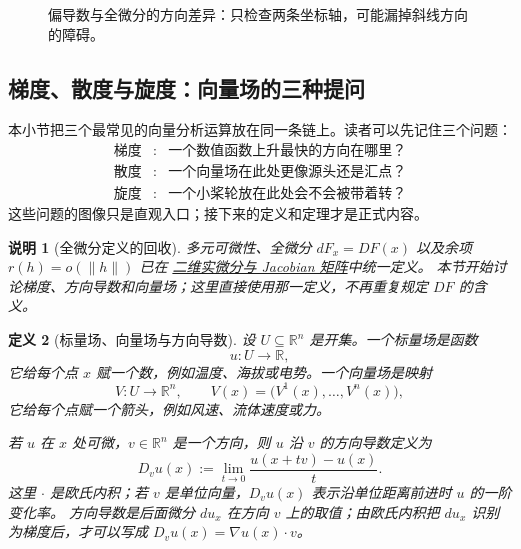 \documentclass[UTF8,fontset=none,a4paper,11pt]{ctexart}
\theoremstyle{foundation-definition}
\newtheorem{definition}{定义}[section]
\theoremstyle{foundation-theorem}
\theoremstyle{foundation-proposition}
\theoremstyle{foundation-example}
\theoremstyle{foundation-remark}
\newtheorem{remark}[definition]{说明}
\theoremstyle{foundation-theorem}
\newcommand{\term}[2]{\hyperref[#1]{#2}}
\begin{document}
\begin{figure}[htbp]
\centering
{}
\caption{偏导数与全微分的方向差异：只检查两条坐标轴，可能漏掉斜线方向的障碍。}
\label{fig:partial-vs-total-differential}
\end{figure}

\subsection{梯度、散度与旋度：向量场的三种提问}

本小节把三个最常见的向量分析运算放在同一条链上。读者可以先记住三个问题：
\[
\begin{array}{ccl}
\text{梯度} &:& \text{一个数值函数上升最快的方向在哪里？}\\
\text{散度} &:& \text{一个向量场在此处更像源头还是汇点？}\\
\text{旋度} &:& \text{一个小桨轮放在此处会不会被带着转？}
\end{array}
\]
这些问题的图像只是直观入口；接下来的定义和定理才是正式内容。

\begin{remark}[全微分定义的回收]
多元可微性、全微分 \(dF_x=DF(x)\) 以及余项
\(r(h)=o(\lVert h\rVert)\) 已在
\term{def:total-differential}{二维实微分与 Jacobian 矩阵}中统一定义。
本节开始讨论梯度、方向导数和向量场；这里直接使用那一定义，不再重复规定
\(DF\) 的含义。
\end{remark}

\begin{definition}[标量场、向量场与方向导数]\label{def:vector-calculus-triad}
设 \(U\subseteq\mathbb R^n\) 是开集。一个标量场是函数
\[
u:U\longrightarrow\mathbb R,
\]
它给每个点 \(x\) 赋一个数，例如温度、海拔或电势。一个向量场是映射
\[
V:U\longrightarrow\mathbb R^n,\qquad
V(x)=\bigl(V^1(x),\ldots,V^n(x)\bigr),
\]
它给每个点赋一个箭头，例如风速、流体速度或力。

若 \(u\) 在 \(x\) 处可微，\(v\in\mathbb R^n\) 是一个方向，则 \(u\) 沿 \(v\) 的方向导数定义为
\[
D_vu(x):=\lim_{t\to0}\frac{u(x+tv)-u(x)}{t}.
\]
这里 \(\cdot\) 是欧氏内积；若 \(v\) 是单位向量，\(D_vu(x)\) 表示沿单位距离前进时 \(u\) 的一阶变化率。
方向导数是后面微分 \(du_x\) 在方向 \(v\) 上的取值；由欧氏内积把
\(du_x\) 识别为梯度后，才可以写成
\(D_vu(x)=\nabla u(x)\cdot v\)。
\end{definition}
\end{document}
